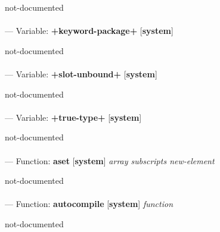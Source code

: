 \begin{adjustwidth}{5em}{5em}
not-documented
\end{adjustwidth}

\paragraph{}
\label{SYSTEM:+KEYWORD-PACKAGE+}
--- Variable: \textbf{+keyword-package+} [\textbf{system}] \textit{}

\begin{adjustwidth}{5em}{5em}
not-documented
\end{adjustwidth}

\paragraph{}
\label{SYSTEM:+SLOT-UNBOUND+}
--- Variable: \textbf{+slot-unbound+} [\textbf{system}] \textit{}

\begin{adjustwidth}{5em}{5em}
not-documented
\end{adjustwidth}

\paragraph{}
\label{SYSTEM:+TRUE-TYPE+}
--- Variable: \textbf{+true-type+} [\textbf{system}] \textit{}

\begin{adjustwidth}{5em}{5em}
not-documented
\end{adjustwidth}

\paragraph{}
\label{SYSTEM:ASET}
--- Function: \textbf{aset} [\textbf{system}] \textit{array subscripts new-element}

\begin{adjustwidth}{5em}{5em}
not-documented
\end{adjustwidth}

\paragraph{}
\label{SYSTEM:AUTOCOMPILE}
--- Function: \textbf{autocompile} [\textbf{system}] \textit{function}

\begin{adjustwidth}{5em}{5em}
not-documented
\end{adjustwidth}

